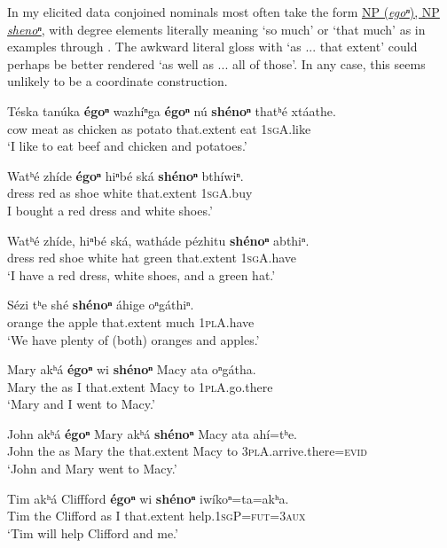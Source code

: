 \documentclass[output=paper]{LSP/langsci}
\begin{document}
In my elicited data conjoined nominals most often take the form \uline{NP (\textit{egoⁿ}), NP} \uline{\textit{shenoⁿ}}, with degree elements literally meaning `so much' or `that much' as in examples  through . The awkward literal gloss with `as ... that extent' could perhaps be better rendered `as well as ... all of those'. In any case, this seems unlikely to be a coordinate construction.

\begin{exe}
\ex\label{ex:rudin:18}
\gll Téska 	tanúka 	\textbf{égoⁿ} 	wazhíⁿga 	\textbf{égoⁿ}	nú \textbf{shénoⁿ} thatʰé  xtáathe.\\
	cow   	meat    	as     	chicken   	as     	potato 	that.extent 	eat      	\textsc{1sgA}.like\\
\trans `I like to eat beef and chicken and potatoes.'    
 
 \ex\label{ex:rudin:19}
\gll Watʰé 	zhíde 	\textbf{égoⁿ} 	hiⁿbé 	ská    \textbf{	shénoⁿ}  	bthíwiⁿ.\\
	dress   	red  	as   	shoe 	white 	that.extent 	\textsc{1sgA}.buy\\
\trans I bought a red dress and white shoes.'  

\ex\label{ex:rudin:20}
\gll Watʰé  zhíde,  hiⁿbé	ská,  watháde  pézhitu \textbf{shénoⁿ} abthiⁿ.\\ 
dress   	red   	shoe 	white 	hat  	green 	that.extent 	\textsc{1sgA}.have \\
\trans `I have a red dress, white shoes, and a green hat.'   

\ex\label{ex:rudin:21}
\gll Sézi  	tʰe 	shé  	\textbf{shénoⁿ} 	áhige 	oⁿgáthiⁿ. \\
	orange 	the 	apple 	that.extent 	much  	\textsc{1plA}.have \\
\trans `We have plenty of (both) oranges and apples.'

\ex\label{ex:rudin:22}
\gll Mary akʰá  	\textbf{égoⁿ} wi \textbf{shénoⁿ} Macy ata oⁿgátha. \\
 Mary	the  as  	I 	that.extent  	Macy to 	\textsc{1plA}.go.there \\
\trans `Mary and I went to Macy.'

\ex\label{ex:rudin:23}
\gll John akʰá \textbf{égoⁿ} Mary akʰá \textbf{shénoⁿ} Macy ata ahí=tʰe. \\
 John the 	as  Mary the 	that.extent  Macy to \textsc{3plA}.arrive.there=\textsc{evid} \\
\trans `John and Mary went to Macy.'
 
\ex\label{ex:rudin:24} 
\gll Tim akʰá Cliffford \textbf{égoⁿ} wi \textbf{shénoⁿ} iwíkoⁿ=ta=akʰa. \\
Tim the Clifford as 	I  that.extent  help.\textsc{1sgP}=\textsc{fut=3aux} \\
\trans `Tim will help Clifford and me.'
\end{exe}
\end{document}
